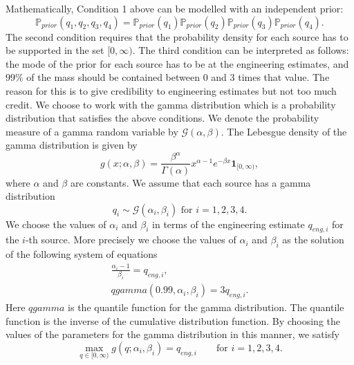 \documentclass{sfuthesis}
\newcommand{\prior}{\mathbb{P}_{prior}}
\begin{document}
Mathematically, Condition 1 above can be modelled with an independent  prior:
\begin{equation*}
\prior(q_{1},q_{2},q_{3},q_{4})=\prior(q_{1})\prior(q_{2})\prior(q_{3})\prior(q_{4}).
\end{equation*}
The second condition requires that the probability density for each source has to 
be supported in the set $[0,\infty)$. The third  condition can be interpreted
as follows: the mode of the prior  for each source has to be at the
engineering estimates, and $99\%$ of the mass should be contained between 0 and 3
times that value. The reason for this is to give credibility to 
engineering estimates but not too much credit. We choose to work with the gamma distribution which is a probability distribution that 
satisfies the above conditions. We denote the probability measure of a gamma random variable by 
$\mathscr{G}(\alpha,\beta)$. The Lebesgue density
of the gamma distribution is given by
\begin{equation*}
g(x;\alpha,\beta)=\frac{\beta^{\alpha}}{\Gamma(\alpha)}x^{\alpha-1}e^{-\beta x}\textbf{1}_{[0,\infty)},
\end{equation*}
where $\alpha$ and $\beta$ are constants. We  assume that each source has 
a  gamma distribution 
\begin{equation}\label{eqnPriorq}
q_{i}\sim \mathscr{G}(\alpha_{i},\beta_{i})\text{ for }{i=1,2,3,4}.
\end{equation}
We choose the values of $\alpha_{i}$ and $\beta_{i}$  in terms of
the engineering estimate $q_{eng,i}$ for the $i$-th source.
More precisely we choose the values of $\alpha_{i}$ and $\beta_{i}$ 
as the solution of the 
following system of equations
\begin{eqnarray*}
\frac{\alpha_{i}-1}{\beta_{i}}=q_{eng,i}, \\
qgamma(0.99,\alpha_{i},\beta_{i})=3q_{eng,i}.
\end{eqnarray*}
Here $qgamma$ is the quantile function for the gamma distribution. The quantile function
is the inverse of the cumulative distribution function.
By choosing the values
of the parameters for the gamma distribution in this manner, we satisfy
\begin{equation*}
\max_{q\in [0,\infty)}g(q;\alpha_{i},\beta_{i})=q_{eng,i}\qquad\text{for }i=1,2,3,4.
\end{equation*}
\end{document}
